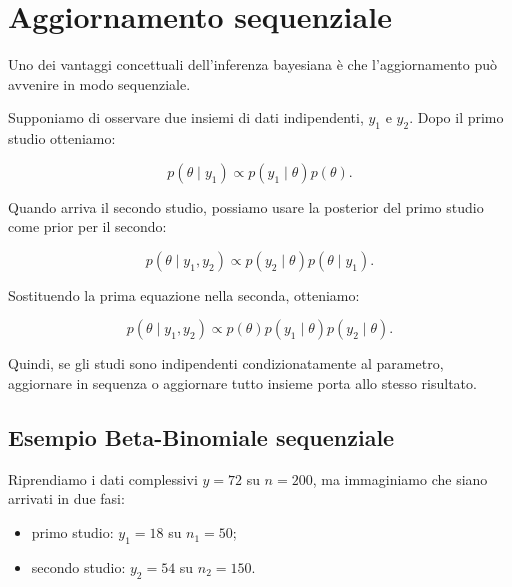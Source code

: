 \documentclass[
  italian,
  letterpaper,
  a4paper,
  11pt,
  open=any]{scrbook}
\providecommand{\tightlist}{%
  \setlength{\itemsep}{0pt}\setlength{\parskip}{0pt}}
\theoremstyle{plain}
\theoremstyle{definition}
\theoremstyle{definition}
\theoremstyle{remark}
\begin{document}
\section{Aggiornamento sequenziale}\label{sec-sequential-updating}

Uno dei vantaggi concettuali dell'inferenza bayesiana è che
l'aggiornamento può avvenire in modo sequenziale.

Supponiamo di osservare due insiemi di dati indipendenti, \(y_1\) e
\(y_2\). Dopo il primo studio otteniamo:

\[
p(\theta \mid y_1) \propto p(y_1 \mid \theta)p(\theta).
\]

Quando arriva il secondo studio, possiamo usare la posterior del primo
studio come prior per il secondo:

\[
p(\theta \mid y_1, y_2)
\propto p(y_2 \mid \theta)p(\theta \mid y_1).
\]

Sostituendo la prima equazione nella seconda, otteniamo:

\[
p(\theta \mid y_1, y_2)
\propto p(\theta)p(y_1 \mid \theta)p(y_2 \mid \theta).
\]

Quindi, se gli studi sono indipendenti condizionatamente al parametro,
aggiornare in sequenza o aggiornare tutto insieme porta allo stesso
risultato.

\subsection{Esempio Beta-Binomiale
sequenziale}\label{esempio-beta-binomiale-sequenziale}

Riprendiamo i dati complessivi \(y=72\) su \(n=200\), ma immaginiamo che
siano arrivati in due fasi:

\begin{itemize}
\tightlist
\item
  primo studio: \(y_1 = 18\) su \(n_1 = 50\);
\item
  secondo studio: \(y_2 = 54\) su \(n_2 = 150\).
\end{itemize}
\end{document}
